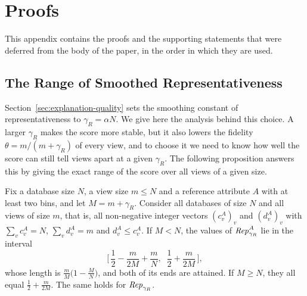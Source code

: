 \section{Proofs}
\label{app:proofs}

This appendix contains the proofs and the supporting statements that were deferred from the body of the paper, in the order in which they are used.

\subsection{The Range of Smoothed Representativeness}
\label{app:proof-rep-range}

Section~\ref{sec:explanation-quality} sets the smoothing constant of representativeness to $\gamma_R=\alpha N$.
We give here the analysis behind this choice.
A larger $\gamma_R$ makes the score more stable, but it also lowers the fidelity $\theta=m/(m+\gamma_R)$ of every view, and to choose it we need to know how well the score can still tell views apart at a given $\gamma_R$.
The following proposition answers this by giving the exact range of the score over all views of a given size.

\begin{proposition}
\label{prop:rep-range}
Fix a database size $N$, a view size $m\le N$ and a reference attribute $A$ with at least two bins, and let $M=m+\gamma_R$.
Consider all databases of size $N$ and all views of size $m$, that is, all non-negative integer vectors $(c^A_v)_v$ and $(d^A_v)_v$ with $\sum_v c^A_v=N$, $\sum_v d^A_v=m$ and $d^A_v\le c^A_v$.
If $M<N$, the values of $\mathit{Rep}^A_{\gamma_R}$ lie in the interval
\[
\Big[\,\frac12-\frac{m}{2M}+\frac{m}{N},\;\; \frac12+\frac{m}{2M}\,\Big],
\]
whose length is $\frac{m}{M}\big(1-\frac{M}{N}\big)$, and both of its ends are attained.
If $M\ge N$, they all equal $\frac12+\frac{m}{2M}$.
The same holds for $\mathit{Rep}_{\gamma_R}$.
\end{proposition}


